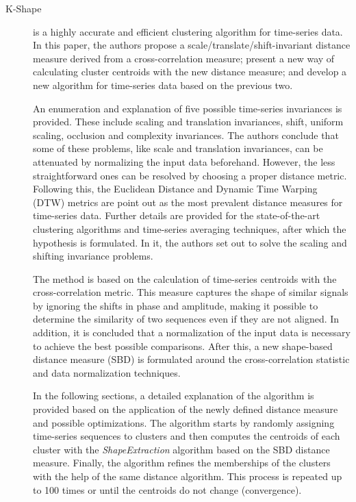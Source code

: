 \begin{description}
    \item[K-Shape]\cite{Paparrizos.Gravano_kShapeEfficientAccurate_2015a} is a highly accurate and efficient clustering algorithm for time-series data. In this paper, the authors propose a scale/translate/shift-invariant distance measure derived from a cross-correlation measure; present a new way of calculating cluster centroids with the new distance measure; and develop a new algorithm for time-series data based on the previous two.
    
    An enumeration and explanation of five possible time-series invariances is provided. These include scaling and translation invariances, shift, uniform scaling, occlusion and complexity invariances. The authors conclude that some of these problems, like scale and translation invariances, can be attenuated by normalizing the input data beforehand. However, the less straightforward ones can be resolved by choosing a proper distance metric. Following this, the Euclidean Distance and Dynamic Time Warping (DTW) metrics are point out as the most prevalent distance measures for time-series data. Further details are provided for the state-of-the-art clustering algorithms and time-series averaging techniques, after which the hypothesis is formulated. In it, the authors set out to solve the scaling and shifting invariance problems.

    The method is based on the calculation of time-series centroids with the cross-correlation metric. This measure captures the shape of similar signals by ignoring the shifts in phase and amplitude, making it possible to determine the similarity of two sequences even if they are not aligned. In addition, it is concluded that a normalization of the input data is necessary to achieve the best possible comparisons. After this, a new shape-based distance measure (SBD) is formulated around the cross-correlation statistic and data normalization techniques.

    In the following sections, a detailed explanation of the algorithm is provided based on the application of the newly defined distance measure and possible optimizations. The algorithm starts by randomly assigning time-series sequences to clusters and then computes the centroids of each cluster with the \textit{ShapeExtraction} algorithm based on the SBD distance measure. Finally, the algorithm refines the memberships of the clusters with the help of the same distance algorithm. This process is repeated up to 100 times or until the centroids do not change (convergence).


\end{description}
